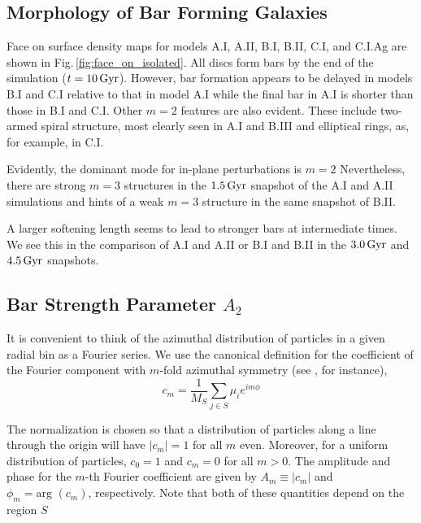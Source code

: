 \subsection{Morphology of Bar Forming Galaxies}

Face on surface density maps for models A.I, A.II, B.I, B.II, C.I, and
C.I.Ag are shown in Fig.\,\ref{fig:face_on_isolated}.  All discs form
bars by the end of the simulation ($t=10\,{\rm Gyr}$).  However, bar
formation appears to be delayed in models B.I and C.I relative to that
in model A.I while the final bar in A.I is shorter than those in B.I
and C.I.  Other $m=2$ features are also evident.  These include
two-armed spiral structure, most clearly seen in A.I and B.III and
elliptical rings, as, for example, in C.I.

Evidently, the dominant mode for in-plane perturbations is $m=2$
Nevertheless, there are strong $m=3$ structures in the $1.5\,{\rm
  Gyr}$ snapshot of the A.I and A.II simulations and hints of a weak
$m=3$ structure in the same snapshot of B.II.

A larger softening length seems to lead to stronger bars at
intermediate times.  We see this in the comparison of A.I and A.II or
B.I and B.II in the $3.0\,{\rm Gyr}$ and $4.5\,{\rm Gyr}$ snapshots.

\subsection{Bar Strength Parameter $A_2$}

It is convenient to think of the azimuthal distribution of particles
in a given radial bin as a Fourier series.  {We use the canonical definition for the coefficient
of the Fourier component with $m$-fold azimuthal symmetry (see \citet{debattista_sellwood_2000}, for instance),}
\begin{equation}\label{eq:cm}
c_m =  \frac{1}{M_S} \sum_{j \in S} \mu_i e^{i m \phi}
\end{equation}

The normalization is
chosen so that a distribution of particles along a line through the
origin will have $|c_m|=1$ for all $m$ even.  Moreover, for a uniform
distribution of particles, $c_0=1$ and $c_m=0$ for all $m>0$.  The
amplitude and phase for the $m$-th Fourier coefficient are given by
$A_m \equiv \vert c_m \vert$ and $\phi_m = \text{arg } (c_m)$,
respectively.  Note that both of these quantities depend on the region
$S$

